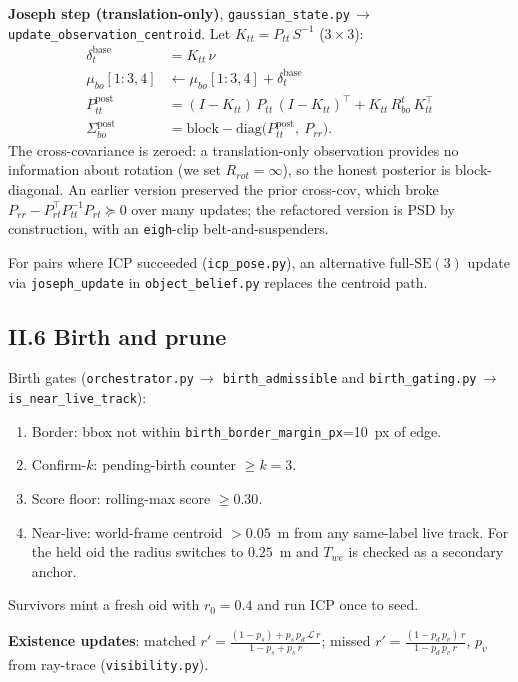 \documentclass[11pt]{article}
\newcommand{\SE}{\mathrm{SE}(3)}
\newcommand{\file}[1]{\texttt{#1}}
\begin{document}
\textbf{Joseph step (translation-only)}, \file{gaussian\_state.py}\,$\to$
\texttt{update\_observation\_centroid}. Let $K_{tt} = P_{tt}\,S^{-1}$ ($3\times 3$):
\begin{align*}
  \delta_t^{\text{base}} &= K_{tt}\,\nu \\
  \mu_{bo}[1{:}3, 4] &\leftarrow \mu_{bo}[1{:}3, 4] + \delta_t^{\text{base}} \\
  P_{tt}^{\text{post}} &= (I - K_{tt})\,P_{tt}\,(I - K_{tt})^\top + K_{tt}\,R_{bo}^t\,K_{tt}^\top \\
  \Sigma_{bo}^{\text{post}} &= \mathrm{block\!-\!diag}\bigl(P_{tt}^{\text{post}},\ P_{rr}\bigr).
\end{align*}
The cross-covariance is zeroed: a translation-only observation
provides no information about rotation (we set $R_{rot}=\infty$),
so the honest posterior is block-diagonal. An earlier version
preserved the prior cross-cov, which broke
$P_{rr}-P_{rt}^\top P_{tt}^{-1}P_{rt}\succeq 0$ over many updates;
the refactored version is PSD by construction, with an
\texttt{eigh}-clip belt-and-suspenders.

For pairs where ICP succeeded (\file{icp\_pose.py}), an alternative
full-$\SE$ update via \texttt{joseph\_update} in
\file{object\_belief.py} replaces the centroid path.

\subsection*{II.6 Birth and prune}

Birth gates (\file{orchestrator.py}\,$\to$ \texttt{birth\_admissible}
and \file{birth\_gating.py}\,$\to$ \texttt{is\_near\_live\_track}):
\begin{enumerate}
\item Border: bbox not within \texttt{birth\_border\_margin\_px}=10~px of edge.
\item Confirm-$k$: pending-birth counter $\ge k=3$.
\item Score floor: rolling-max score $\ge 0.30$.
\item Near-live: world-frame centroid $> 0.05$~m from any same-label
  live track. For the held oid the radius switches to $0.25$~m and
  $T_{we}$ is checked as a secondary anchor.
\end{enumerate}
Survivors mint a fresh oid with $r_0 = 0.4$ and run ICP once to seed.

\textbf{Existence updates}: matched
$r' = \frac{(1-p_s)+p_s\,p_d\,\mathcal{L}\,r}{1-p_s+p_s\,r}$;
missed $r' = \frac{(1-p_d\,p_v)\,r}{1-p_d\,p_v\,r}$, $p_v$ from
ray-trace (\file{visibility.py}).
\end{document}

